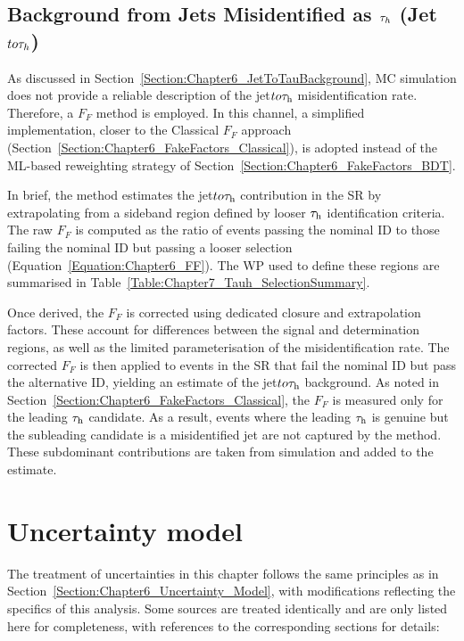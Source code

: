 \subsection{\texorpdfstring{Background from Jets Misidentified as $\tau_h$ (Jet $to \tau_h$)}{Background from Jets Misidentified as hadronic taus}}
\label{Section:Chapter7_FF}

As discussed in Section~\ref{Section:Chapter6_JetToTauBackground}, MC simulation does not provide a reliable description of the jet$to\tau_\mathrm{h}$ misidentification rate. Therefore, a $F_F$ method is employed. In this channel, a simplified implementation, closer to the Classical $F_F$ approach (Section~\ref{Section:Chapter6_FakeFactors_Classical}), is adopted instead of the \ac{ML}-based reweighting strategy of Section~\ref{Section:Chapter6_FakeFactors_BDT}. 

In brief, the method estimates the jet$to\tau_\mathrm{h}$ contribution in the \ac{SR} by extrapolating from a sideband region defined by looser $\tau_\mathrm{h}$ identification criteria. The raw $F_F$ is computed as the ratio of events passing the nominal ID to those failing the nominal ID but passing a looser selection (Equation~\ref{Equation:Chapter6_FF}). The \ac{WP} used to define these regions are summarised in Table~\ref{Table:Chapter7_Tauh_SelectionSummary}.

Once derived, the $F_F$ is corrected using dedicated closure and extrapolation factors. These account for differences between the signal and determination regions, as well as the limited parameterisation of the misidentification rate. The corrected $F_F$ is then applied to events in the \ac{SR} that fail the nominal ID but pass the alternative ID, yielding an estimate of the jet$to\tau_\mathrm{h}$ background. As noted in Section~\ref{Section:Chapter6_FakeFactors_Classical}, the $F_F$ is measured only for the leading $\tau_\mathrm{h}$ candidate. As a result, events where the leading $\tau_\mathrm{h}$ is genuine but the subleading candidate is a misidentified jet are not captured by the method. These subdominant contributions are taken from simulation and added to the estimate.

\section{Uncertainty model}
\label{Section:Chapter7_UncertaintyModel}

The treatment of uncertainties in this chapter follows the same principles as in Section~\ref{Section:Chapter6_Uncertainty_Model}, with modifications reflecting the specifics of this analysis. Some sources are treated identically and are only listed here for completeness, with references to the corresponding sections for details:

